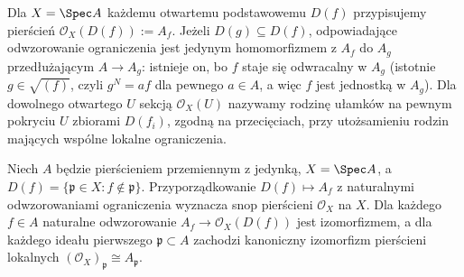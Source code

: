 \begin{definicja}
\label{def:O-Spec}
Dla $X=\Spec A$ każdemu otwartemu podstawowemu
$D(f)$ przypisujemy pierścień
$\mathcal O_X(D(f)):=A_f$.
Jeżeli $D(g)\subseteq D(f)$, odpowiadające
odwzorowanie ograniczenia jest jedynym homomorfizmem
z $A_f$ do $A_g$ przedłużającym $A\to A_g$:
istnieje on, bo $f$ staje się odwracalny w $A_g$
(istotnie $g\in\sqrt{(f)}$, czyli $g^N=af$
dla pewnego $a\in A$, a więc $f$ jest jednostką
w $A_g$). Dla dowolnego otwartego $U$ sekcją
$\mathcal O_X(U)$ nazywamy rodzinę ułamków
na pewnym pokryciu $U$ zbiorami $D(f_i)$,
zgodną na przecięciach, przy utożsamieniu
rodzin mających wspólne lokalne ograniczenia.
\end{definicja}

\begin{twierdzenie}
\label{tw:structural-sheaf}
Niech $A$ będzie pierścieniem przemiennym z jedynką,
$X=\Spec A$, a $D(f)=\{\mathfrak p\in X:f\notin\mathfrak p\}$.
Przyporządkowanie $D(f)\mapsto A_f$ z naturalnymi
odwzorowaniami ograniczenia wyznacza snop pierścieni
$\mathcal O_X$ na $X$.
Dla każdego $f\in A$ naturalne odwzorowanie
$A_f\to\mathcal O_X(D(f))$ jest izomorfizmem,
a dla każdego ideału pierwszego $\mathfrak p\subset A$
zachodzi kanoniczny izomorfizm pierścieni lokalnych
$(\mathcal O_X)_{\mathfrak p}\cong A_{\mathfrak p}$.
\end{twierdzenie}
